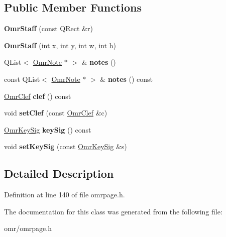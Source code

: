 \subsection*{Public Member Functions}
\begin{DoxyCompactItemize}
\item 
\mbox{\label{class_ms_1_1_omr_staff_a2eb9ff9acc24711c906b48d68c78de78}} 
{\bfseries Omr\+Staff} (const Q\+Rect \&r)
\item 
\mbox{\label{class_ms_1_1_omr_staff_a35ca5b6c7bba285e4137840e7fa13cad}} 
{\bfseries Omr\+Staff} (int x, int y, int w, int h)
\item 
\mbox{\label{class_ms_1_1_omr_staff_a73e151af52dea6d13d1ee35b70940f2e}} 
Q\+List$<$ \hyperlink{class_ms_1_1_omr_note}{Omr\+Note} $\ast$ $>$ \& {\bfseries notes} ()
\item 
\mbox{\label{class_ms_1_1_omr_staff_a4015665c1388734595ac40c77d45e5c9}} 
const Q\+List$<$ \hyperlink{class_ms_1_1_omr_note}{Omr\+Note} $\ast$ $>$ \& {\bfseries notes} () const
\item 
\mbox{\label{class_ms_1_1_omr_staff_a0333cd66c20a686374a26d615086b38e}} 
\hyperlink{class_ms_1_1_omr_clef}{Omr\+Clef} {\bfseries clef} () const
\item 
\mbox{\label{class_ms_1_1_omr_staff_a80a161855ab98caa4fea2bdcc9bdefed}} 
void {\bfseries set\+Clef} (const \hyperlink{class_ms_1_1_omr_clef}{Omr\+Clef} \&c)
\item 
\mbox{\label{class_ms_1_1_omr_staff_a9b59e05bbfaf119875c152879e9c80b6}} 
\hyperlink{class_ms_1_1_omr_key_sig}{Omr\+Key\+Sig} {\bfseries key\+Sig} () const
\item 
\mbox{\label{class_ms_1_1_omr_staff_a3e7dc4210c3942c6f7dd87f01c510809}} 
void {\bfseries set\+Key\+Sig} (const \hyperlink{class_ms_1_1_omr_key_sig}{Omr\+Key\+Sig} \&s)
\end{DoxyCompactItemize}


\subsection{Detailed Description}


Definition at line 140 of file omrpage.\+h.



The documentation for this class was generated from the following file\+:\begin{DoxyCompactItemize}
\item 
omr/omrpage.\+h\end{DoxyCompactItemize}

